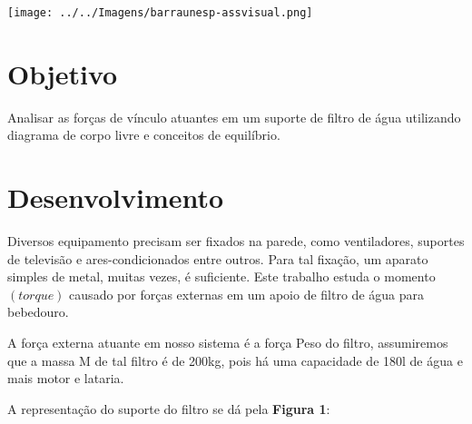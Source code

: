 \documentclass[
	12pt,				%
	oneside,			%
	a4paper,			%
	english,			%
	french,				%
	spanish,			%
	brazil,				%
	]{abntex2}
\begin{document}
\begin{minipage}[c][1.5cm][c]{3cm} %

\texttt{[image: ../../Imagens/barraunesp-assvisual.png]}

\end{minipage}


\frenchspacing 


\imprimircapa


\tableofcontents*
\newpage

\section[Objetivo]{Objetivo}
\pagestyle{fancy}

Analisar as forças de vínculo atuantes em um suporte de filtro de água utilizando diagrama de corpo livre e conceitos de equilíbrio.

\newpage
\section[Desenvolvimento]{Desenvolvimento}

Diversos equipamento precisam ser fixados na parede, como ventiladores, suportes de televisão e ares-condicionados entre outros. Para tal fixação, um aparato simples de metal, muitas vezes, é suficiente. Este trabalho estuda o momento $(torque)$ causado por forças externas em um apoio de filtro de água para bebedouro. \cite{hibbeler2005estatica}

A força externa atuante em nosso sistema é a força Peso do filtro, assumiremos que a massa M de tal filtro é de 200kg, pois há uma capacidade de 180l de água e mais motor e lataria.
 
A representação do suporte do filtro se dá pela \textbf{Figura 1}:
\end{document}
